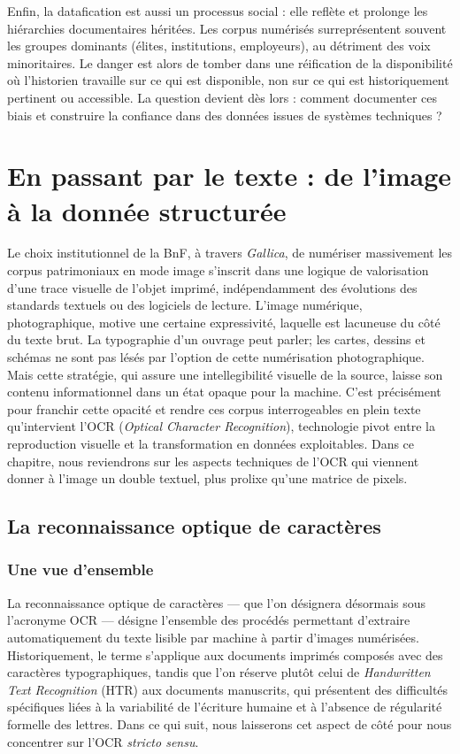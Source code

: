 Enfin, la datafication est aussi un processus social : elle reflète et prolonge les hiérarchies documentaires héritées. Les corpus numérisés surreprésentent souvent les groupes dominants (élites, institutions, employeurs), au détriment des voix minoritaires. Le danger est alors de tomber dans une réification de la disponibilité où l’historien travaille sur ce qui est disponible, non sur ce qui est historiquement pertinent ou accessible. La question devient dès lors : comment documenter ces biais et construire la confiance dans des données issues de systèmes techniques ? 

\chapter{En passant par le texte : de l'image à la donnée structurée}

Le choix institutionnel de la BnF, à travers \emph{Gallica}, de numériser massivement les corpus patrimoniaux en mode image s’inscrit dans une logique de valorisation d'une trace visuelle de l’objet imprimé, indépendamment des évolutions des standards textuels ou des logiciels de lecture. L’image numérique, photographique, motive une certaine expressivité, laquelle est lacuneuse du côté du texte brut. La typographie d'un ouvrage peut parler; les cartes, dessins et schémas ne sont pas lésés par l'option de cette numérisation photographique. Mais cette stratégie, qui assure une intellegibilité visuelle de la source, laisse son contenu informationnel dans un état opaque pour la machine. C’est précisément pour franchir cette opacité et rendre ces corpus interrogeables en plein texte qu’intervient l’OCR (\emph{Optical Character Recognition}), technologie pivot entre la reproduction visuelle et la transformation en données exploitables. Dans ce chapitre, nous reviendrons sur les aspects techniques de l'OCR qui viennent donner à l'image un double textuel, plus prolixe qu'une matrice de pixels.

\section{La reconnaissance optique de caractères}

\subsection{Une vue d’ensemble}

La reconnaissance optique de caractères — que l’on désignera désormais sous l’acronyme OCR — désigne l’ensemble des procédés permettant d’extraire automatiquement du texte lisible par machine à partir d’images numérisées. Historiquement, le terme s’applique aux documents imprimés composés avec des caractères typographiques, tandis que l’on réserve plutôt celui de \emph{Handwritten Text Recognition} (HTR) aux documents manuscrits, qui présentent des difficultés spécifiques liées à la variabilité de l’écriture humaine et à l’absence de régularité formelle des lettres. Dans ce qui suit, nous laisserons cet aspect de côté pour nous concentrer sur l’OCR \emph{stricto sensu}.

